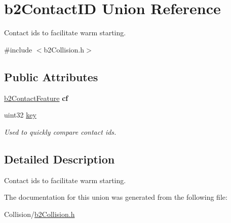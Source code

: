 \hypertarget{unionb2ContactID}{}\section{b2\+Contact\+ID Union Reference}
\label{unionb2ContactID}


Contact ids to facilitate warm starting.  




{\ttfamily \#include $<$b2\+Collision.\+h$>$}

\subsection*{Public Attributes}
\begin{DoxyCompactItemize}
\item 
\mbox{\label{unionb2ContactID_a58b6732f909bc760f75e7aff3cd4be08}} 
\mbox{\hyperlink{structb2ContactFeature}{b2\+Contact\+Feature}} {\bfseries cf}
\item 
\mbox{\label{unionb2ContactID_a04c04f8fdcb799b33552d01b3aa3f245}} 
uint32 \mbox{\hyperlink{unionb2ContactID_a04c04f8fdcb799b33552d01b3aa3f245}{key}}
\begin{DoxyCompactList}\small\item\em Used to quickly compare contact ids. \end{DoxyCompactList}\end{DoxyCompactItemize}


\subsection{Detailed Description}
Contact ids to facilitate warm starting. 

The documentation for this union was generated from the following file\+:\begin{DoxyCompactItemize}
\item 
Collision/\mbox{\hyperlink{b2Collision_8h}{b2\+Collision.\+h}}\end{DoxyCompactItemize}
